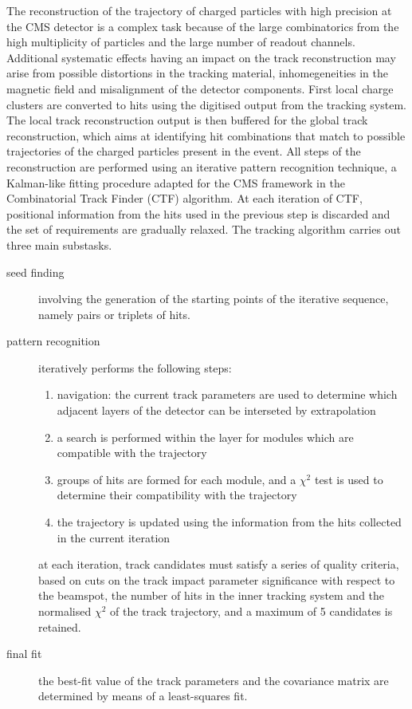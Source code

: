 The reconstruction of the trajectory of charged particles with high precision at the CMS detector
is a complex task because of the large combinatorics from the high multiplicity of particles and the large number of readout channels.
Additional systematic effects having an impact on the track reconstruction may arise from possible distortions in the tracking
material, inhomegeneities in the magnetic field and misalignment of the detector components.
First local charge clusters are converted to hits using the digitised output from the tracking system.
The local track reconstruction output is then buffered for the global track reconstruction, which aims at identifying
hit combinations that match to possible trajectories of the charged particles present in the event.
All steps of the reconstruction are performed using an iterative pattern recognition technique, a Kalman-like fitting procedure adapted for the CMS framework in the Combinatorial Track Finder \cite{billoir.qian:simultaneous} (CTF) algorithm.
At each iteration of CTF, positional information from the hits used in the previous step is discarded and the set of requirements are gradually relaxed.
The tracking algorithm carries out three main substasks.
\begin{description}
\item[seed finding] involving the generation of the starting points of the iterative sequence, namely pairs or triplets of hits.
\item[pattern recognition] iteratively performs the following steps:
  \begin{enumerate}
  \item navigation: the current track parameters are used to determine which adjacent layers of the detector can be interseted by extrapolation
  \item a search is performed within the layer for modules which are compatible with the trajectory
  \item groups of hits are formed for each module, and a $\chi^2$ test is used to determine their compatibility with the trajectory
  \item the trajectory is updated using the information from the hits collected in the current iteration
  \end{enumerate}
  at each iteration, track candidates must satisfy a series of quality criteria, based on cuts on the track impact parameter significance with respect to the beamspot, the number of hits in the inner tracking system and the normalised $\chi^2$ of the track trajectory, and a maximum of 5 candidates is retained.
\item[final fit] the best-fit value of the track parameters and the covariance matrix are determined by means of a least-squares fit.
\end{description}

